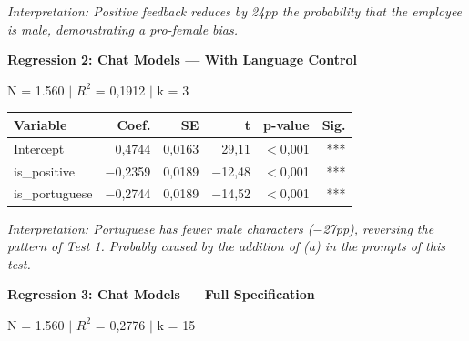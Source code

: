 \documentclass[jair,11pt,letterpaper]{article}
\begin{document}
\noindent\textit{Interpretation: Positive feedback reduces by 24pp the probability that the
employee is male, demonstrating a pro-female bias.}

\vspace{0.5cm}
\noindent\textbf{Regression 2: Chat Models --- With Language Control}

\noindent N = 1.560 $|$ $R^2$ = 0,1912 $|$ k = 3
\begin{table}[H]
\centering
\begin{tabular}{lrrrrr}
\toprule
\textbf{Variable} & \textbf{Coef.} & \textbf{SE} & \textbf{t} & \textbf{p-value} & \textbf{Sig.} \\
\midrule
Intercept & 0,4744 & 0,0163 & 29,11 & $<$0,001 & *** \\
is\_positive & $-$0,2359 & 0,0189 & $-$12,48 & $<$0,001 & *** \\
is\_portuguese & $-$0,2744 & 0,0189 & $-$14,52 & $<$0,001 & *** \\
\bottomrule
\end{tabular}
\end{table}

\noindent\textit{Interpretation: Portuguese has fewer male characters ($-$27pp),
reversing the pattern of Test 1. Probably caused by the addition of (a)
in the prompts of this test.}

\vspace{0.5cm}
\noindent\textbf{Regression 3: Chat Models --- Full Specification}

\noindent N = 1.560 $|$ $R^2$ = 0,2776 $|$ k = 15
\end{document}
